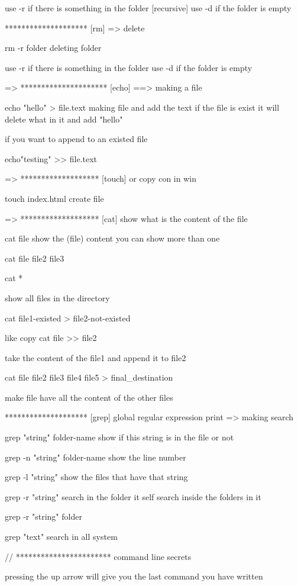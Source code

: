 use -r  if there is something in the folder [recursive]
use -d if the folder is empty 


******************** [rm]   => delete 

rm -r folder      deleting folder 

use -r if there is something in the folder 
use -d if the folder is empty 


=> ********************* [echo]   ==> making a file     

echo "hello" > file.text 
making file and add the text 
if the file is exist it will delete what in it and add "hello"

if you want to append to an existed file 

echo"testing" >> file.text

=>  ******************* [touch] or copy con  in win 

touch index.html 
create file 

=> ******************* [cat]   show what is the content of the file 

cat file 
show the (file) content 
you can show more than one 

cat file file2 file3

cat * 

show all files in the directory 

cat file1-existed > file2-not-existed 

like copy 
cat file >> file2 

take the content of the file1 and append it to file2

cat file file2 file3 file4 file5  > final_destination 

make file have all the content of the other files 


********************  [grep]   global regular expression print 
=> making search 

grep "string"  folder-name 
  show if this string  is in the file or not

grep -n "string"  folder-name 
  show the line number 

grep -l "string"  
  show the files that have that string


grep -r "string" 
  search in the folder it self  search inside the folders in it 

grep -r "string" folder

grep "text" 
search in all system 

// ***********************  command line secrets 

pressing the up arrow 
will give you the last command you have written 

